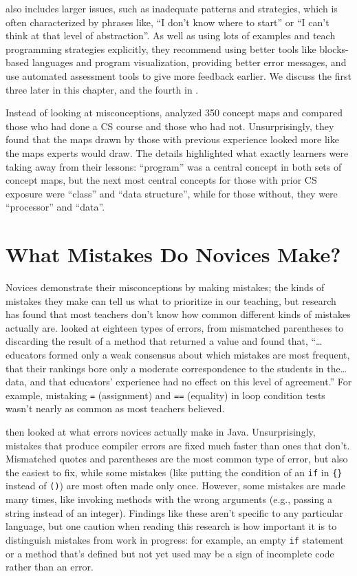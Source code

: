 \cite{Qian2017} also includes larger issues, such as inadequate
patterns and strategies, which is often characterized by phrases like,
``I don't know where to start'' or ``I can't think at that level of
abstraction''.  As well as using lots of examples and teach
programming strategies explicitly, they recommend using better tools
like blocks-based languages and program visualization, providing
better error messages, and use automated assessment tools to give more
feedback earlier.  We discuss the first three later in this chapter,
and the fourth in .

Instead of looking at misconceptions, \cite{Muhl2016} analyzed 350
concept maps and compared those who had done a CS course and those who
had not.  Unsurprisingly, they found that the maps drawn by those with
previous experience looked more like the maps experts would draw.  The
details highlighted what exactly learners were taking away from their
lessons: ``program'' was a central concept in both sets of concept
maps, but the next most central concepts for those with prior CS
exposure were ``class'' and ``data structure'', while for those
without, they were ``processor'' and ``data''.

\section{What Mistakes Do Novices Make?}\label{s:pck-mistakes}

Novices demonstrate their misconceptions by making mistakes; the kinds
of mistakes they make can tell us what to prioritize in our teaching,
but research has found that most teachers don't know how common
different kinds of mistakes actually are.  \cite{Brow2018} looked at
eighteen types of errors, from mismatched parentheses to discarding
the result of a method that returned a value and found that,
``{\ldots}educators formed only a weak consensus about which mistakes
are most frequent, that their rankings bore only a moderate
correspondence to the students in the{\ldots}data, and that educators'
experience had no effect on this level of agreement.''  For example,
mistaking \texttt{=} (assignment) and \texttt{==} (equality) in loop
condition tests wasn't nearly as common as most teachers believed.

\cite{Brow2018} then looked at what errors novices actually make in
Java.  Unsurprisingly, mistakes that produce compiler errors are fixed
much faster than ones that don't.  Mismatched quotes and parentheses
are the most common type of error, but also the easiest to fix, while
some mistakes (like putting the condition of an \texttt{if} in
\texttt{\{\}} instead of \texttt{()}) are most often made only once.
However, some mistakes are made many times, like invoking methods with
the wrong arguments (e.g., passing a string instead of an integer).
Findings like these aren't specific to any particular language, but
one caution when reading this research is how important it is to
distinguish mistakes from work in progress: for example, an empty
\texttt{if} statement or a method that's defined but not yet used may
be a sign of incomplete code rather than an error.

